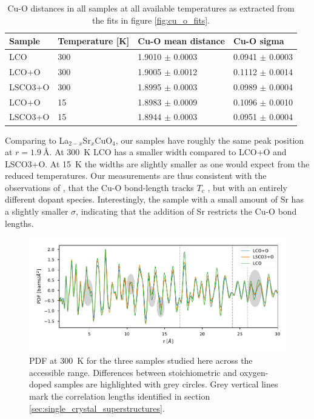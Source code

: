 \begin{table}
    \centering
    \begin{tabular}{llll}
        \toprule
          Sample & Temperature [K] &   Cu-O mean distance &           Cu-O sigma \\
        \midrule
             LCO &             300 &  1.9010 $\pm$ 0.0003 &  0.0941 $\pm$ 0.0003 \\
           LCO+O &             300 &  1.9005 $\pm$ 0.0012 &  0.1112 $\pm$ 0.0014 \\
         LSCO3+O &             300 &  1.8995 $\pm$ 0.0003 &  0.0989 $\pm$ 0.0004 \\
           LCO+O &              15 &  1.8983 $\pm$ 0.0009 &  0.1096 $\pm$ 0.0010 \\
         LSCO3+O &              15 &  1.8944 $\pm$ 0.0003 &  0.0951 $\pm$ 0.0004 \\
        \bottomrule
    \end{tabular}
    \caption{Cu-O distances in all samples at all available temperatures as extracted from the fits in figure \ref{fig:cu_o_fits}.}
    \label{tab:cu_o_fits}
\end{table}

Comparing to La$_{2-x}$Sr$_x$CuO$_{4}$, our samples have roughly the same peak position at $r=\SI{1.9}{\angstrom}$. At \SI{300}{\kelvin} LCO has a smaller width compared to LCO+O and LSCO3+O. At \SI{15}{\kelvin} the widths are slightly smaller as one would expect from the reduced temperatures. Our measurements are thus consistent with the observations of \cite{Bozin2000}, that the Cu-O bond-length tracks $T_c$ , but with an entirely different dopant species. Interestingly, the sample with a small amount of Sr has a slightly smaller $\sigma$, indicating that the addition of Sr restricts the Cu-O bond lengths.

\begin{figure}
    \centering
    \includegraphics[width=\textwidth]{fig/pdf/300k_all.pdf}
    \caption{PDF at \SI{300}{\kelvin} for the three samples studied here across the accessible range. Differences between stoichiometric and oxygen-doped samples are highlighted with grey circles. Grey vertical lines mark the correlation lengths identified in section \ref{sec:single_crystal_superstructures}.}
    \label{fig:pdf_all_300K}
\end{figure}

